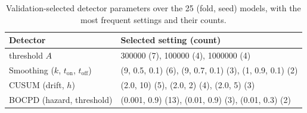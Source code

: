 \begin{table}[!htbp]
\centering
\caption{Validation-selected detector parameters over the 25 (fold, seed) models, with the most frequent settings and their counts.}
\label{tab:s-configs}
\footnotesize
\setlength{\tabcolsep}{3pt}
\begin{tabular}{@{}lp{6.0cm}@{}}
\toprule
Detector & Selected setting (count)\\
\midrule
\method{} threshold $A$ & 300000 (7), 100000 (4), 1000000 (4)\\
Smoothing ($k$, $t_{\mathrm{on}}$, $t_{\mathrm{off}}$) & (9, 0.5, 0.1) (6), (9, 0.7, 0.1) (3), (1, 0.9, 0.1) (2)\\
CUSUM (drift, $h$) & (2.0, 10) (5), (2.0, 2) (4), (2.0, 5) (3)\\
BOCPD (hazard, threshold) & (0.001, 0.9) (13), (0.01, 0.9) (3), (0.01, 0.3) (2)\\
\bottomrule
\end{tabular}
\end{table}
